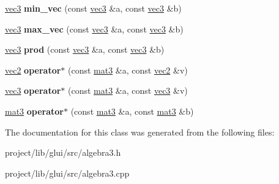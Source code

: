 \begin{DoxyCompactItemize}
\item 
\hypertarget{classvec3_a6e9f78953f1d63ec8cee3fb16b828cc8}{\hyperlink{classvec3}{vec3} {\bfseries min\-\_\-vec} (const \hyperlink{classvec3}{vec3} \&a, const \hyperlink{classvec3}{vec3} \&b)}\label{classvec3_a6e9f78953f1d63ec8cee3fb16b828cc8}

\item 
\hypertarget{classvec3_a6b61534e725e4a5fea030d02daa3d43a}{\hyperlink{classvec3}{vec3} {\bfseries max\-\_\-vec} (const \hyperlink{classvec3}{vec3} \&a, const \hyperlink{classvec3}{vec3} \&b)}\label{classvec3_a6b61534e725e4a5fea030d02daa3d43a}

\item 
\hypertarget{classvec3_aa4e6ac89db67a3ca3f78380dac421502}{\hyperlink{classvec3}{vec3} {\bfseries prod} (const \hyperlink{classvec3}{vec3} \&a, const \hyperlink{classvec3}{vec3} \&b)}\label{classvec3_aa4e6ac89db67a3ca3f78380dac421502}

\item 
\hypertarget{classvec3_a307ae299187b6d9e75b1a7730b6213c2}{\hyperlink{classvec2}{vec2} {\bfseries operator$\ast$} (const \hyperlink{classmat3}{mat3} \&a, const \hyperlink{classvec2}{vec2} \&v)}\label{classvec3_a307ae299187b6d9e75b1a7730b6213c2}

\item 
\hypertarget{classvec3_a46bbeb7eed270ad69b34c3a1b93eb050}{\hyperlink{classvec3}{vec3} {\bfseries operator$\ast$} (const \hyperlink{classmat3}{mat3} \&a, const \hyperlink{classvec3}{vec3} \&v)}\label{classvec3_a46bbeb7eed270ad69b34c3a1b93eb050}

\item 
\hypertarget{classvec3_a0df0a7a0901cee5daec15003ee3594fc}{\hyperlink{classmat3}{mat3} {\bfseries operator$\ast$} (const \hyperlink{classmat3}{mat3} \&a, const \hyperlink{classmat3}{mat3} \&b)}\label{classvec3_a0df0a7a0901cee5daec15003ee3594fc}

\end{DoxyCompactItemize}


The documentation for this class was generated from the following files\-:\begin{DoxyCompactItemize}
\item 
project/lib/glui/src/algebra3.\-h\item 
project/lib/glui/src/algebra3.\-cpp\end{DoxyCompactItemize}
